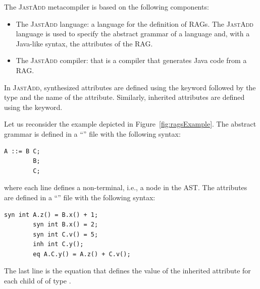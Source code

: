 The \textsc{JastAdd} metacompiler is based on the following components:
\begin{itemize}
    \item The \textsc{JastAdd} language: a language for the definition of RAGs.
    The \textsc{JastAdd} language is used to specify the abstract grammar of a language and,
    with a Java-like syntax, the attributes of the RAG.
    \item The \textsc{JastAdd} compiler: that is a compiler that generates Java code from a RAG.
\end{itemize}
In \textsc{JastAdd}, synthesized attributes are defined using the  keyword followed
by the type and the name of the attribute. Similarly, inherited attributes are defined
using the  keyword.

Let us reconsider the example depicted in Figure~\ref{fig:ragsExample}.
The abstract grammar is defined in a ``'' file with the following syntax:
    \begin{lstlisting}[language=JastAdd]
        A ::= B C;
        B;
        C;
    \end{lstlisting}
where each line defines a non-terminal, i.e., a node in the AST.
The attributes are defined in a ``'' file with the following syntax:
    \begin{lstlisting}[language=JastAdd]
        syn int A.z() = B.x() + 1;
        syn int B.x() = 2;
        syn int C.v() = 5;
        inh int C.y();
        eq A.C.y() = A.z() + C.v();
    \end{lstlisting}
The last line is the equation that defines the value of the inherited attribute  for each child of  of type .
